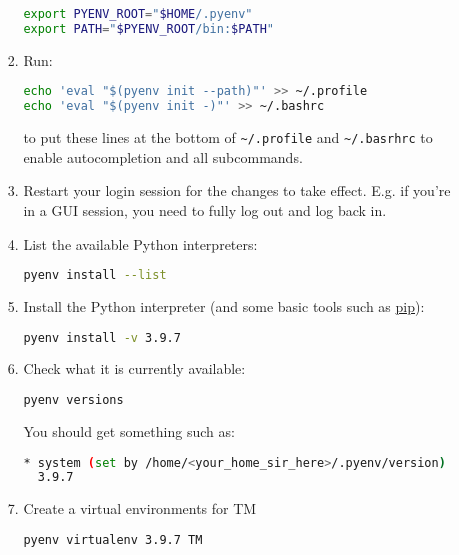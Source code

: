 \begin{enumerate}
\begin{enumerate}
\begin{enumerate}
        \begin{lstlisting}[mathescape=false, language=Bash]
export PYENV_ROOT="$HOME/.pyenv"
export PATH="$PYENV_ROOT/bin:$PATH"
        \end{lstlisting}

      \item Run:
        \begin{lstlisting}[mathescape=false, language=Bash]
echo 'eval "$(pyenv init --path)"' >> ~/.profile
echo 'eval "$(pyenv init -)"' >> ~/.bashrc
        \end{lstlisting}
        to put these lines at the bottom of \verb|~/.profile| and \verb|~/.basrhrc| to enable autocompletion and all subcommands.

      \item Restart your login session for the changes to take
        effect. E.g. if you're in a GUI session, you need to fully log
        out and log back in.

      \item List the available Python interpreters:
        \begin{lstlisting}[mathescape=false, language=Bash]
pyenv install --list
        \end{lstlisting}

      \item Install the Python interpreter (and some basic tools such as \href{https://pypi.org/project/pip/}{pip}):
        \begin{lstlisting}[mathescape=false, language=Bash]
pyenv install -v 3.9.7
        \end{lstlisting}

      \item Check what it is currently available:
        \begin{lstlisting}[mathescape=false, language=Bash]
pyenv versions        
        \end{lstlisting}
        You should get something such as:
        \begin{lstlisting}[mathescape=false, language=Bash]
* system (set by /home/<your_home_sir_here>/.pyenv/version)
  3.9.7
        \end{lstlisting}

        \item Create a virtual environments for TM
        \begin{lstlisting}[mathescape=false, language=Bash]
pyenv virtualenv 3.9.7 TM
        \end{lstlisting}


\end{enumerate}
\end{enumerate}
\end{enumerate}
